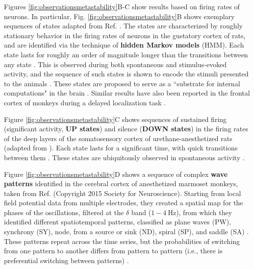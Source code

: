 \documentclass[reprint,superscriptaddress,showpacs,amsmath,amssymb,aps,floatfix,nolongbibliography]{revtex4-2}
\theoremstyle{definition}
\newcommand{\Emph}[1]{\textbf{#1}}
\begin{document}
Figures \ref{fig:observationsmetastability}B-C show results based on firing rates of neurons. In particular, Fig. \ref{fig:observationsmetastability}B shows exemplary sequences of states adapted from Ref. \cite{brinkman2022metastable}. The states are characterized by roughly stationary behavior in the firing rates of neurons in the gustatory cortex of rats, and are identified via the technique of \Emph{hidden Markov models} (HMM). Each state lasts for roughly an order of magnitude longer than the transitions between any state \cite{jones2007natural, lacamera2019cortical, mazzucato2019expectation, recanatesi2021metastable, brinkman2022metastable}. This is observed during both spontaneous and stimulus-evoked activity, and the sequence of such states is shown to encode the stimuli presented to the animals \cite{lacamera2019cortical, mazzucato2019expectation}. These states are proposed to serve as a ``substrate for internal computations" in the brain \cite{lacamera2019cortical}. Similar results have also been reported in the frontal cortex of monkeys during a delayed localization task \cite{abeles1995cortical, seidemann1996simultaneously}.

Figure \ref{fig:observationsmetastability}C shows sequences of sustained firing (significant activity, \Emph{UP states}) and silence (\Emph{DOWN states}) in the firing rates of the deep layers of the somatosensory cortex of urethane-anesthetized rats (adapted from \cite{jercog2017updown}). Each state lasts for a significant time, with quick transitions between them \cite{jercog2017updown}. These states are ubiquitously observed in spontaneous activity \cite{luczak2007sequential, jercog2017updown}. 

Figure \ref{fig:observationsmetastability}D shows a sequence of complex \Emph{wave patterns} identified in the cerebral cortex of anesthetized marmoset monkeys, taken from Ref. \cite{townsend2015emergence} (Copyright 2015 Society for Neuroscience). Starting from local field potential data from multiple electrodes, they created a spatial map for the phases of the oscillations, filtered at the $\delta$ band ($1-\SI{4}{\hertz}$), from which they identified different spatiotemporal patterns, classified as plane waves (PW), synchrony (SY), node, from a source or sink (ND), spiral (SP), and saddle (SA) \cite{townsend2015emergence}. These patterns repeat across the time series, but the probabilities of switching from one pattern to another differs from pattern to pattern (i.e., there is preferential switching between patterns) \cite{townsend2015emergence}.
\end{document}
